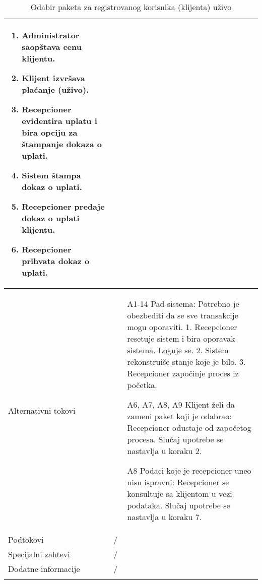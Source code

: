 \documentclass[../main.tex]{subfiles}
\begin{document}
\begin{longtable}{| p{} | p{} |}
\begin{enumerate}
        \item Administrator saopštava cenu klijentu.
        \item Klijent izvršava plaćanje (uživo).
        \item Recepcioner evidentira uplatu i bira opciju za štampanje dokaza o uplati.
        \item Sistem štampa dokaz o uplati.
        \item Recepcioner predaje dokaz o uplati klijentu.
        \item Recepcioner prihvata dokaz o uplati.
    \end{enumerate}\\
\hline
    Alternativni tokovi & \begin{itemize}
        \item [A1-14] Pad sistema: Potrebno je obezbediti da se sve transakcije mogu oporaviti.
        1. Recepcioner resetuje sistem i bira oporavak sistema. Loguje se.
        2. Sistem rekonstruiše stanje koje je bilo.
        3. Recepcioner započinje proces iz početka.
        \item [A6, A7, A8, A9] Klijent želi da zameni paket koji je odabrao: Recepcioner odustaje od započetog procesa. Slučaj upotrebe se nastavlja u koraku 2.
        \item [A8] Podaci koje je recepcioner uneo nisu ispravni: Recepcioner se konsultuje sa klijentom u vezi podataka. Slučaj upotrebe se nastavlja u koraku 7.
    \end{itemize}\\
\hline
    Podtokovi & /\\
\hline
    Specijalni zahtevi & /\\
\hline
    Dodatne informacije & /\\
\hline
\caption{Odabir paketa za registrovanog korisnika (klijenta) uživo} %
\end{longtable}
\end{document}

